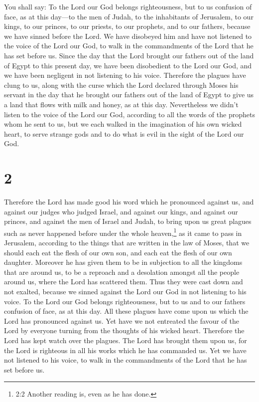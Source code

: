  You shall say: To the Lord our God belongs righteousness,
but to us confusion of face, as at this day---to the men of Judah, to
the inhabitants of Jerusalem,  to our kings, to our
princes, to our priests, to our prophets, and to our fathers,
 because we have sinned before the Lord.  We
have disobeyed him and have not listened to the voice of the Lord our
God, to walk in the commandments of the Lord that he has set before us.
 Since the day that the Lord brought our fathers out of the
land of Egypt to this present day, we have been disobedient to the Lord
our God, and we have been negligent in not listening to his voice.
 Therefore the plagues have clung to us, along with the
curse which the Lord declared through Moses his servant in the day that
he brought our fathers out of the land of Egypt to give us a land that
flows with milk and honey, as at this day.  Nevertheless we
didn't listen to the voice of the Lord our God, according to all the
words of the prophets whom he sent to us,  but we each
walked in the imagination of his own wicked heart, to serve strange gods
and to do what is evil in the sight of the Lord our God.

\hypertarget{section-1}{%
\section{2}\label{section-1}}

 Therefore the Lord has made good his word which he
pronounced against us, and against our judges who judged Israel, and
against our kings, and against our princes, and against the men of
Israel and Judah,  to bring upon us great plagues such as
never happened before under the whole heaven,\footnote{2:2 Another
  reading is, even as he has done.} as it came to pass in Jerusalem,
according to the things that are written in the law of Moses,
 that we should each eat the flesh of our own son, and each
eat the flesh of our own daughter.  Moreover he has given
them to be in subjection to all the kingdoms that are around us, to be a
reproach and a desolation amongst all the people around us, where the
Lord has scattered them.  Thus they were cast down and not
exalted, because we sinned against the Lord our God in not listening to
his voice.  To the Lord our God belongs righteousness, but
to us and to our fathers confusion of face, as at this day. 
All these plagues have come upon us which the Lord has pronounced
against us.  Yet have we not entreated the favour of the
Lord by everyone turning from the thoughts of his wicked heart.
 Therefore the Lord has kept watch over the plagues. The
Lord has brought them upon us, for the Lord is righteous in all his
works which he has commanded us.  Yet we have not listened
to his voice, to walk in the commandments of the Lord that he has set
before us.

